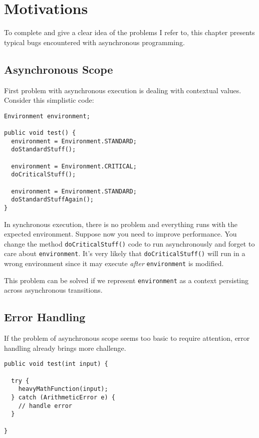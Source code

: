 
\chapter{Motivations}
\label{ch:motiv}
To complete and give a clear idea of the problems I refer to, this chapter presents typical bugs encountered with asynchronous programming.

\section{Asynchronous Scope}

First problem with asynchronous execution is dealing with contextual values. Consider this simplistic code:

\begin{lstlisting}
Environment environment;

public void test() {
  environment = Environment.STANDARD;
  doStandardStuff();

  environment = Environment.CRITICAL;
  doCriticalStuff();

  environment = Environment.STANDARD;
  doStandardStuffAgain();
}
\end{lstlisting}

In synchronous execution, there is no problem and everything runs with the expected environment. Suppose now you need to improve performance. You change the method \lstinline{doCriticalStuff()} code to run asynchronously and forget to care about \lstinline{environment}. It's very likely that \lstinline{doCriticalStuff()} will run in a wrong environment since it may execute \emph{after} \lstinline{environment} is modified.


This problem can be solved if we represent \lstinline{environment} as a context persisting across asynchronous transitions.


\section{Error Handling}

If the problem of asynchronous scope seems too basic to require attention, error handling already brings more challenge.

\begin{lstlisting}
public void test(int input) {
  
  try {
    heavyMathFunction(input);
  } catch (ArithmeticError e) {
    // handle error
  }

}
\end{lstlisting}

